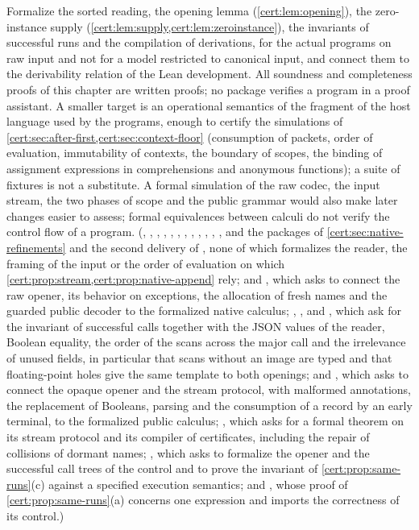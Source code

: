 \begin{question}
Formalize the sorted reading, the opening lemma
(\cref{cert:lem:opening}), the zero-instance supply
(\cref{cert:lem:supply,cert:lem:zeroinstance}), the invariants of successful
runs and the compilation of derivations, for the actual programs on raw
input and not for a model restricted to canonical input, and connect them to
the derivability relation of the Lean development. All soundness and
completeness proofs of this chapter are written proofs; no package verifies a
program in a proof assistant. A smaller target is an operational semantics
of the fragment of the host language used by the programs, enough to certify
the simulations of \cref{cert:sec:after-first,cert:sec:context-floor}
(consumption of packets, order of evaluation, immutability of contexts, the
boundary of scopes, the binding of assignment expressions in comprehensions
and anonymous functions); a suite of fixtures is not a substitute. A formal
simulation of the raw codec, the input stream, the two phases of scope and
the public grammar would also make later changes easier to assess; formal
equivalences between calculi do not verify the control flow of a program.
(, ,
, , ,
, ,
, ,
, , ,
and the packages of \cref{cert:sec:native-refinements} and the second delivery
of , none of which formalizes the reader, the
framing of the input or the order of evaluation on which
\cref{cert:prop:stream,cert:prop:native-append} rely; and ,
which asks to connect the raw opener, its behavior on exceptions, the allocation of
fresh names and the guarded public decoder to the formalized native calculus;
, ,  and
, which ask for the invariant of successful calls together with the
JSON values of the reader, Boolean equality, the order of the scans across the major call and the
irrelevance of unused fields, in particular that scans without an image are typed and that
floating-point holes give the same template to both openings; and ,
which asks to connect the opaque opener and the stream protocol, with malformed annotations, the
replacement of Booleans, parsing and the consumption of a record by an early terminal, to the
formalized public calculus; , which asks for a formal theorem on its stream
protocol and its compiler of certificates, including the repair of collisions of dormant names;
, which asks to formalize the opener and the successful call trees of the control and to
prove the invariant of \cref{cert:prop:same-runs}(c) against a specified execution semantics; and
, whose proof of \cref{cert:prop:same-runs}(a) concerns one expression and
imports the correctness of its control.)
\end{question}

